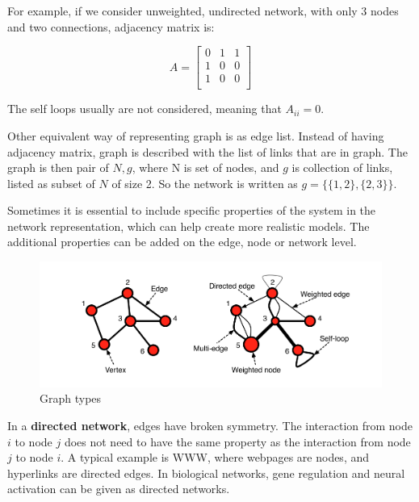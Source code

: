 For example, if we consider unweighted, undirected network, with only 3 nodes and two connections, adjacency matrix is:


\begin{equation}
A = \begin{bmatrix}
0 & 1 & 1\\
1 & 0 & 0 \\
1 & 0 & 0 \\
\end{bmatrix}
\end{equation}

The self loops usually are not considered, meaning that $A_{ii}=0$. 

Other equivalent way of representing graph is as edge list. Instead of having adjacency matrix, graph is described with the list of links that are in graph. The graph is then pair of $N, g$, where N is set of nodes, and $g$ is collection of links, listed as subset of $N$ of size 2. So the network is written as $g = \{ \{1,2\}, \{2,3\}\}$.

Sometimes it is essential to include specific properties of the system in the network representation, which can help create more realistic models. The additional properties can be added on the edge, node or network level. \\

\begin{figure}[h!]
	\centering
	\includegraphics[width=1\linewidth]{figures/methodology/graph1.png} 
	\caption{Graph types}
	\label{fig:gt1}
\end{figure}

In a \textbf{directed network}, edges have broken symmetry. The interaction from node $i$ to node $j$ does not need to have the same property as the interaction from node $j$ to node $i$. A typical example is WWW, where webpages are nodes, and hyperlinks are directed edges. In biological networks, gene regulation and neural activation can be given as directed networks. \\ %

